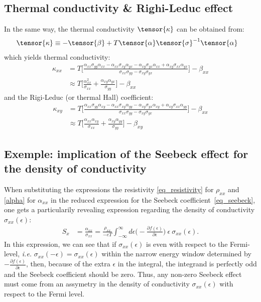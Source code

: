 \documentclass[notitlepage,11pt,nofootinbib]{revtex4-1}
\begin{document}
\subsection{Thermal conductivity \& Righi-Leduc effect}
In the same way, the thermal conductivity $\tensor{\kappa}$ can be obtained from:
\begin{align}
\tensor{\kappa} &\equiv -\tensor{\beta} + T\tensor{\alpha}\tensor{\sigma}^{-1}\tensor{\alpha}
\end{align}
which yields thermal conductivity:
\begin{align}
\kappa_{xx} 
&=
T\Big[\frac{
\alpha_{xx}\sigma_{yy}\alpha_{xx} -
\alpha_{xx}\sigma_{xy}\alpha_{yx} -
\alpha_{xy}\sigma_{yx}\alpha_{xx} +
\alpha_{xy}\sigma_{xx}\alpha_{yx}
}{\sigma_{xx}\sigma_{yy}-\sigma_{xy}\sigma_{yx}}
\Big] - \beta_{xx}
\\ &
\approx
T\Big[ \frac{
\alpha_{xx}^2
}{\sigma_{xx}}
+
\frac{
\alpha_{xy}\alpha_{yx}
}{\sigma_{yy}}
\Big] - \beta_{xx}
\end{align}
and the Rigi-Leduc (or thermal Hall) coefficient:
\begin{align}
\kappa_{xy} 
&=
T\Big[\frac{
\alpha_{xx}\sigma_{yy}\alpha_{xy} -
\alpha_{xx}\sigma_{xy}\alpha_{yy} -
\alpha_{xy}\sigma_{yx}\alpha_{xy} +
\alpha_{xy}\sigma_{xx}\alpha_{yy}
}{\sigma_{xx}\sigma_{yy}-\sigma_{xy}\sigma_{yx}}
\Big] - \beta_{xx}
\\ &
\approx
T\Big[ \frac{
\alpha_{xx}\alpha_{xy}
}{\sigma_{xx}}
+
\frac{
\alpha_{xy}\alpha_{yy}
}{\sigma_{yy}}
\Big] - \beta_{xy}
\end{align}

\subsection{Exemple: implication of the Seebeck effect for the density of conductivity}
When substituting the expressions the resistivity \eqref{eq_resistivity} for $\rho_{xx}$ and \eqref{alpha} for $\alpha_{xx}$ in the reduced expression for the Seebeck coefficient~\eqref{eq_seebeck}, one gets a particularily revealing expression regarding the density of conductivity $\sigma_{xx}(\epsilon)$:
\begin{align}
S_x 
&=
\frac{\alpha_{xx}}{\sigma_{xx}}
=
\frac{\rho_{xx}}{-eT}
\int_{-\infty}^{\infty}d\epsilon
\Big(-\frac{\partial f(\epsilon)}{\partial \epsilon}\Big)
\ \epsilon\ 
\sigma_{xx}(\epsilon).
\label{eq_seebeck_explicit}
\end{align}
In this expression, we can see that if $\sigma_{xx}(\epsilon)$ is even with respect to the Fermi-level, \emph{i.e.} $\sigma_{xx}(-\epsilon) = \sigma_{xx}(\epsilon)$ within the narrow energy window determined by $-\frac{\partial f(\epsilon)}{\partial \epsilon}$, then, because of the extra $\epsilon$ in the integral, the integrand is perfectly odd and the Seebeck coefficient should be zero. Thus, any non-zero Seebeck effect must come from an assymetry in the density of conductivity $\sigma_{xx}(\epsilon)$ with respect to the Fermi level.
\end{document}
